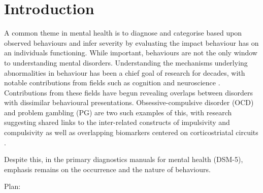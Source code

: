 \section{Introduction}

A common theme in mental health is to diagnose and categorise based upon observed behaviours and infer severity by evaluating the impact behaviour has on an individuals functioning. While important, behaviours are not the only window to understanding mental disorders. Understanding the mechanisms underlying abnormalities in behaviour has been a chief goal of research for decades, with notable contributions from fields such as cognition and neuroscience \cite{Frank_2015}. Contributions from these fields have begun revealing overlaps between disorders with dissimilar behavioural presentations. Obsessive-compulsive disorder (OCD) and problem gambling (PG) are two such examples of this, with research suggesting shared links to the inter-related constructs of impulsivity and compulsivity \cite{Tavares_2007} as well as overlapping biomarkers centered on corticostriatal circuits \cite{van_Holst_2010,Harrison_2009,Harrison_2013}.


Despite this, in the primary diagnostics manuals for mental health (DSM-5), emphasis remains on the occurrence and the nature of behaviours.

Plan:

